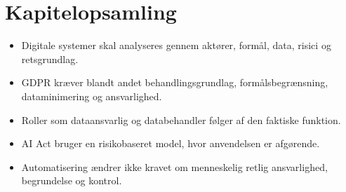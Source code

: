 
\section*{Kapitelopsamling}
\begin{itemize}
  \item Digitale systemer skal analyseres gennem aktører, formål, data, risici og retsgrundlag.
  \item GDPR kræver blandt andet behandlingsgrundlag, formålsbegrænsning, dataminimering og ansvarlighed.
  \item Roller som dataansvarlig og databehandler følger af den faktiske funktion.
  \item AI Act bruger en risikobaseret model, hvor anvendelsen er afgørende.
  \item Automatisering ændrer ikke kravet om menneskelig retlig ansvarlighed, begrundelse og kontrol.
\end{itemize}
